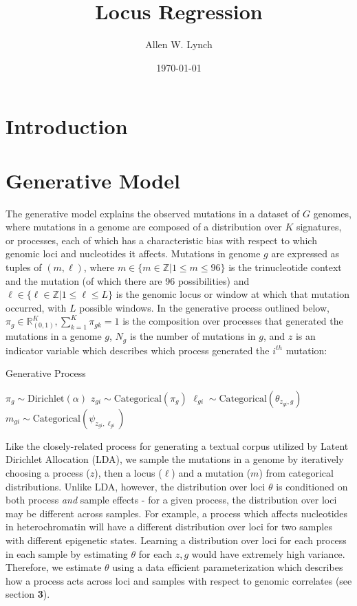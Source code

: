 \documentclass{article}
\author{Allen W. Lynch}
\title{Locus Regression}
\date{\today}
\begin{document}
\maketitle

\section{Introduction}

\section{Generative Model}

The generative model explains the observed mutations in a dataset of $G$ genomes, where mutations in a genome are composed of a 
distribution over $K$ signatures, or processes, each of which has a characteristic bias with respect to which genomic loci and nucleotides it affects. 
Mutations in genome $g$ are expressed as tuples of $(m,\ell)$, where $m \in \{ m \in \mathbb{Z} | 1 \leq m \leq 96\}$ is the trinucleotide context and the mutation (of which there are 96 possibilities)
and $\ell \in \{ \ell \in \mathbb{Z} | 1 \leq \ell \leq L \}$ is the genomic locus or window at which that mutation occurred, with $L$ possible windows. 
In the generative process outlined below, $\pi_g \in \mathbb{R}_{(0,1)}^K, \sum_{k=1}^K \pi_{gk} = 1$ is the composition over processes that generated the mutations in a genome $g$,
$N_g$ is the number of mutations in $g$, and $z$ is an indicator variable which describes which process generated the $i^{th}$ mutation:

\begin{algorithm}
\caption{Generative Process}
\begin{algorithmic}
  \scriptsize
  	\STATE $ \pi_g \sim \textrm{Dirichlet}( \alpha ) $
  		\STATE $ z_{gi} \sim \textrm{Categorical}( \pi_g ) $
  		\STATE $ \ell_{gi} \sim \textrm{Categorical}( \theta_{z_{gi},g} ) $
  		\STATE $ m_{gi} \sim \textrm{Categorical}( \psi_{z_{gi},\ell_{gi}} ) $
  	\ENDFOR
  \ENDFOR
\end{algorithmic}
\end{algorithm}

Like the closely-related process for generating a textual corpus utilized by Latent Dirichlet Allocation (LDA), we sample the mutations in a genome by
iteratively choosing a process ($z$), then a locus ($\ell$) and a mutation ($m$) from categorical distributions. Unlike LDA, however, the distribution over loci $\theta$ 
is conditioned on both process \emph{and} sample effects - for a given process, the distribution over loci may be different across samples. For example, a process which
affects nucleotides in heterochromatin will have a different distribution over loci for two samples with different epigenetic states. Learning a distribution over loci for 
each process in each sample by estimating $\theta$ for each $z,g$ would have extremely high variance.
Therefore, we estimate $\theta$ using a data efficient parameterization which describes how a process acts across loci and samples with respect to genomic correlates (see section \textbf{3}).
\end{document}
